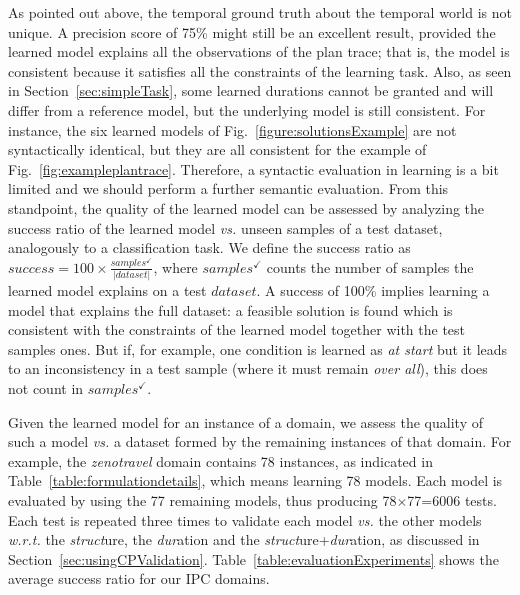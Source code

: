 \documentclass[10pt,journal,compsoc]{IEEEtran}
\begin{document}
As pointed out above, the temporal ground truth about the temporal world is not unique. A precision score of 75\% might still be an excellent result, provided the learned model explains all the observations of the plan trace; that is, the model is consistent because it satisfies all the constraints of the learning task.
Also, as seen in Section~\ref{sec:simpleTask}, some learned durations cannot be granted and will differ from a reference model, but the underlying model is still consistent.
For instance, the six learned models of Fig.~\ref{figure:solutionsExample} are not syntactically identical, but they are all consistent for the example of Fig.~\ref{fig:exampleplantrace}. 
Therefore, a syntactic evaluation in learning is a bit limited and we should perform a further semantic evaluation. From this standpoint, the quality of the learned model can be assessed by analyzing the success ratio of the learned model \emph{vs.} unseen samples of a test dataset, analogously to a classification task. 
We define the success ratio as $success=100 \times \frac{samples^{\checkmark}}{|dataset|}$, where $samples^{\checkmark}$ counts the number of samples the learned model explains on a test $dataset$. A success of 100\% implies learning a model that explains the full dataset: a feasible solution is found which is consistent with the constraints of the learned model together with the test samples ones. 
But if, for example, one condition is learned as \textit{at start} but it leads to an inconsistency in a test sample (where it must remain \textit{over all}), this does not count in $samples^{\checkmark}$.


Given the learned model for an instance of a domain, we assess the quality of such a model \textit{vs.} a dataset formed by the remaining instances of that domain.
For example, the \emph{zenotravel} domain contains 78 instances, as indicated in Table~\ref{table:formulationdetails}, which means learning 78 models. Each model is evaluated by using the 77 remaining models, thus producing 78$\times$77=6006 tests. Each test is repeated three times to validate each model \emph{vs.} the other models \emph{w.r.t.} the \emph{struct}ure, the \emph{dur}ation and the \emph{struct}ure+\emph{dur}ation, as discussed in Section~\ref{sec:usingCPValidation}.
Table~\ref{table:evaluationExperiments} shows the average success ratio for our IPC domains.
\end{document}
